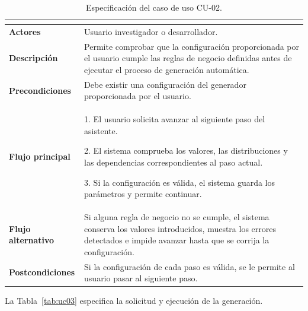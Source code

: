 \begin{table}[H]
\centering
\small
\renewcommand{\arraystretch}{1.35}
\begin{tabular}{@{}>{\bfseries\RaggedRight\arraybackslash}p{4cm} P{10cm}@{}}
\toprule
{} \\
\midrule

Actores &
Usuario investigador o desarrollador. \\

Descripción &
Permite comprobar que la configuración proporcionada por el usuario cumple las reglas de negocio definidas antes de ejecutar el proceso de generación automática. \\

Precondiciones &
Debe existir una configuración del generador proporcionada por el usuario. \\

Flujo principal &
1. El usuario solicita avanzar al siguiente paso del asistente.

2. El sistema comprueba los valores, las distribuciones y las
dependencias correspondientes al paso actual.

3. Si la configuración es válida, el sistema guarda los parámetros y
permite continuar. \\

Flujo alternativo &
Si alguna regla de negocio no se cumple, el sistema conserva los
valores introducidos, muestra los errores detectados e impide avanzar
hasta que se corrija la configuración. \\

Postcondiciones &
Si la configuración de cada paso es válida, se le permite al usuario pasar al siguiente paso. \\

\bottomrule
\end{tabular}
\caption{Especificación del caso de uso CU-02.}
\label{tab:uc02}
\end{table}

La Tabla~\ref{tab:uc03} especifica la solicitud y ejecución de la generación.

